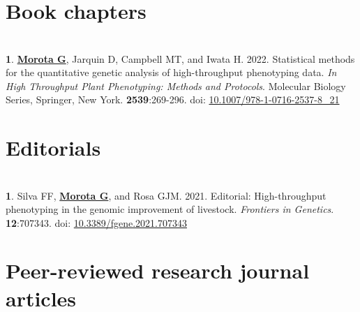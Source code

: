 \documentclass[margin,line,10pt]{res}
\newenvironment{list1}{
  \begin{list}{\ding{113}}{%
      \setlength{\itemsep}{0in}
      \setlength{\parsep}{0in} \setlength{\parskip}{0in}
      \setlength{\topsep}{0in} \setlength{\partopsep}{0in} 
      \setlength{\leftmargin}{0.17in}}}{\end{list}}
\begin{document}
\begin{resume}
\vspace{1.5cm}
\section{\sc Book chapters}
\vspace{1.0cm}

\section{}
\begin{list1}

\item  [{\bf 1}.] \textbf{\underline{Morota G}}, Jarquin D, Campbell MT, and Iwata H. 2022. Statistical methods for the quantitative genetic analysis of high-throughput phenotyping data. \emph{In High Throughput Plant Phenotyping: Methods and Protocols}. Molecular Biology Series, Springer, New York. \textbf{2539}:269-296. doi: \textcolor{blue}{\href{https://doi.org/10.1007/978-1-0716-2537-8_21}{10.1007/978-1-0716-2537-8\_21}}

\end{list1}


\vspace{0.5cm}
\section{\sc Editorials}
\vspace{1.0cm}

\section{}
\begin{list1}
\item [{\bf 1}.]  Silva FF, {\bf \underline{Morota G}}, and Rosa GJM. 2021. Editorial: High-throughput phenotyping in the genomic improvement of livestock. \emph{Frontiers in Genetics}. \textbf{12}:707343. doi: \textcolor{blue}{\href{https://doi.org/10.3389/fgene.2021.707343}{10.3389/fgene.2021.707343}}
\end{list1}



\section{\sc Peer-reviewed research journal articles}

\vspace{1.5cm}





\end{resume}
\end{document}
